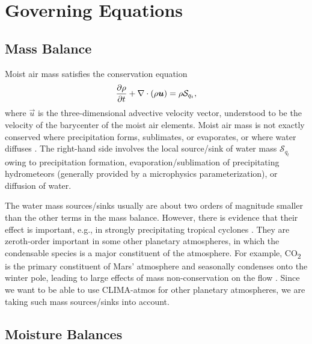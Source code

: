 \documentclass{report}
\begin{document}
\section{Governing Equations}
\label{sec:governing_equations}

\subsection{Mass Balance}

Moist air mass satisfies the conservation equation
\begin{equation}
\frac{\partial \rho}{\partial t} + \nabla \cdot (\rho\boldsymbol{{u}}) = \rho \mathcal{S}_{q_t},
\label{eq:governing_equations/mass}
\end{equation}
where $\vec{u}$ is the three-dimensional advective velocity vector, understood to be the velocity of the barycenter of the moist air elements. Moist air mass is not exactly conserved where precipitation forms, sublimates, or evaporates, or where water diffuses \citep{Bott08a}. The  right-hand side involves the local source/sink of water mass $\mathcal{S}_{q_t}$ owing to precipitation formation, evaporation/sublimation of precipitating hydrometeors (generally provided by a microphysics parameterization), or diffusion of water. 

The water mass sources/sinks usually are about two orders of magnitude smaller than the other terms in the mass balance. However, there is evidence that their effect is important, e.g., in strongly precipitating tropical cyclones \citep{Qiu93a,Lackmann04a}. They are zeroth-order important in some other planetary atmospheres, in which the condensable species is a major constituent of the atmosphere. For example, CO\textsubscript{2} is the primary constituent of Mars' atmosphere and seasonally condenses onto the winter pole, leading to large effects of mass non-conservation on the flow \cite[e.g.,][]{Soto15a}. Since we want to be able to use CLIMA-atmos for other planetary atmospheres, we are taking such mass sources/sinks into account.

\subsection{Moisture Balances}
\end{document}
